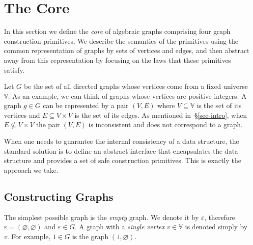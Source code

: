 \vspace{-0.5mm}
\section{The Core}\label{sec-core}
In this section we define the \emph{core} of algebraic graphs comprising
four graph construction primitives. We describe the semantics of the primitives
using the common representation of graphs by sets of vertices and edges, and
then abstract away from this representation by focusing on the laws that these
primitives satisfy.

Let $G$ be the set of all directed graphs whose vertices come from a fixed
universe $\mathbb{V}$. As an example, we can think of graphs whose vertices are
positive integers. A graph $g \in G$ can be represented by a pair $(V, E)$ where
$V\subseteq \mathbb{V}$ is the set of its vertices and $E \subseteq V \times V$ is
the set of its edges. As mentioned in~\S\ref{sec-intro}, when $E \nsubseteq V \times V$
the pair $(V, E)$ is inconsistent and does not correspond to a graph.

When one needs to guarantee the internal consistency of a data structure, the standard
solution is to define an abstract interface that encapsulates the data structure and
provides a set of safe construction primitives. This is exactly the approach we take.

\subsection{Constructing Graphs}\label{sub-constructing}

The simplest possible graph is the \emph{empty} graph. We denote it by
$\varepsilon$, therefore $\varepsilon = (\varnothing, \varnothing)$ and
$\varepsilon \in G$. A graph with a \emph{single vertex} $v \in \mathbb{V}$
is denoted simply by $v$. For example, $1 \in G$ is the graph
$({1}, \varnothing)$.

